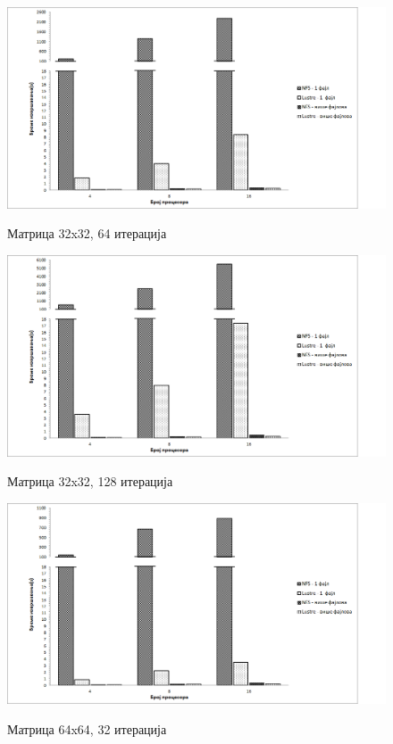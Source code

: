   \begin{figure}[H]
    \centering
        \includegraphics[width=1\textwidth]{slike/results/32_64.png}\\[1cm]
    \caption{Матрица 32x32, 64 итерација}
  \end{figure}
 
    \begin{figure}[H]
      \centering
          \includegraphics[width=1\textwidth]{slike/results/32_128.png}\\[1cm]
      \caption{Матрица 32x32, 128 итерација}
    \end{figure}
   
    \begin{figure}[H]
      \centering
          \includegraphics[width=1\textwidth]{slike/results/64_32.png}\\[1cm]
      \caption{Матрица 64x64, 32 итерација}
    \end{figure}
    

